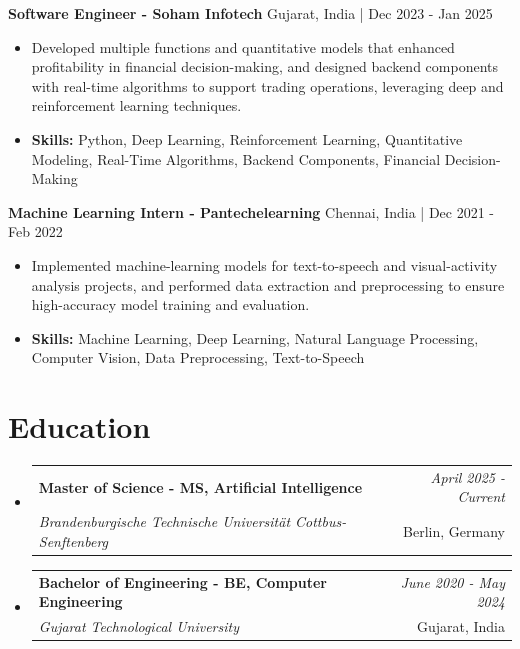 \documentclass[a4paper,11pt]{article}
\makeatletter
\newcommand{\resumeSubheading}[4]{
\vspace{0.5mm}\item
    \begin{tabular*}{\linewidth}[t]{l@{\extracolsep{\fill}}r}
        \textbf{#1} & \textit{\footnotesize{#4}} \\
        \textit{\footnotesize{#3}} &  \footnotesize{#2}\\
    \end{tabular*}
    \vspace{-2.4mm}
}
\makeatother
\begin{document}
\vspace{1mm}
  \textbf{Software Engineer - Soham Infotech} \hfill Gujarat, India | Dec 2023 - Jan 2025
\vspace{-1.5mm} %
\begin{itemize}
  \item Developed multiple functions and quantitative models that enhanced profitability in financial decision-making, and designed backend components with real-time algorithms to support trading operations, leveraging deep and reinforcement learning techniques.

\vspace{-2mm}
  \item \textbf{Skills:} Python, Deep Learning, Reinforcement Learning, Quantitative Modeling, Real-Time Algorithms, Backend Components, Financial Decision-Making
\end{itemize}

\vspace{1mm}
  \textbf{Machine Learning Intern - Pantechelearning} \hfill Chennai, India | Dec 2021 - Feb 2022
\vspace{-1.5mm} %
\begin{itemize}
  \item Implemented machine-learning models for text-to-speech and visual-activity analysis projects, and performed data extraction and preprocessing to ensure high-accuracy model training and evaluation.
\vspace{-2mm}
  \item \textbf{Skills:} Machine Learning, Deep Learning, Natural Language Processing, Computer Vision, Data Preprocessing, Text-to-Speech
\end{itemize}\section{\textbf{Education}}
\vspace{-0.4mm}

\begin{itemize}[leftmargin=0.15in, label={}]
\resumeSubheading
{Master of Science - MS, Artificial Intelligence }{Berlin, Germany}
{Brandenburgische Technische Universität Cottbus-Senftenberg  }{April 2025 - Current}

\vspace{1.0mm} %
\resumeSubheading
{Bachelor of Engineering - BE, Computer Engineering  }{Gujarat, India}
{Gujarat Technological University }{June 2020 - May 2024}

\end{itemize}
\end{document}
